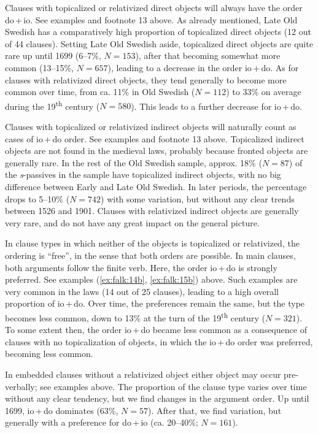 \documentclass[output=paper]{langscibook}
\begin{document}
Clauses with topicalized or relativized direct objects will always have the order do\,+\,io. See examples  and footnote 13 above. As already mentioned, Late Old Swedish has a comparatively high proportion of topicalized direct objects (12 out of 44 clauses). Setting Late Old Swedish aside, topicalized direct objects are quite rare up until 1699 (6–7\%, $N = 153$), after that becoming somewhat more common (13–15\%, $N = 657$), leading to a decrease in the order io\,+\,do. As for clauses with relativized direct objects, they tend generally to become more common over time, from ca. 11\% in Old Swedish ($N = 112$) to 33\% on average during the 19\textsuperscript{th} century ($N = 580$). This leads to a further decrease for io\,+\,do.


 Clauses with topicalized or relativized indirect objects will naturally count as cases of io\,+\,do order. See examples  and footnote 13 above. Topicalized indirect objects are not found in the medieval laws, probably because fronted objects are generally rare. In the rest of the Old Swedish sample, approx. 18\% ($N = 87$) of the \textit{s}{}-passives in the sample have topicalized indirect objects, with no big difference between Early and Late Old Swedish. In later periods, the percentage drops to 5–10\% ($N = 742$) with some variation, but without any clear trends between 1526 and 1901. Clauses with relativized indirect objects are generally very rare, and do not have any great impact on the general picture.



In clause types in which neither of the objects is topicalized or relativized, the ordering is “free”, in the sense that both orders are possible. In main clauses, both arguments follow the finite verb. Here, the order io\,+\,do is strongly preferred. See examples (\ref{ex:falk:14b}, \ref{ex:falk:15b}) above. Such examples are very common in the laws (14 out of 25 clauses), leading to a high overall proportion of io\,+\,do. Over time, the preferences remain the same, but the type becomes less common, down to 13\% at the turn of the 19\textsuperscript{th} century ($N = 321$). To some extent then, the order io\,+\,do became less common as a consequence of clauses with no topicalization of objects, in which the io\,+\,do order was preferred, becoming less common.



In embedded clauses without a relativized object either object may occur pre-verbally; see examples  above. The proportion of the clause type varies over time without any clear tendency, but we find changes in the argument order. Up until 1699, io\,+\,do dominates (63\%, $N = 57$). After that, we find variation, but generally with a preference for do\,+\,io (ca. 20–40\%; $N = 161$).
\end{document}
